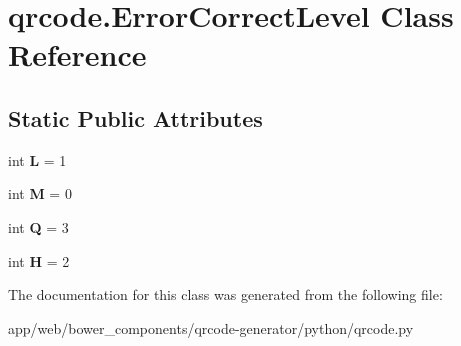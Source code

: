\hypertarget{classqrcode_1_1_error_correct_level}{}\section{qrcode.\+Error\+Correct\+Level Class Reference}
\label{classqrcode_1_1_error_correct_level}
\subsection*{Static Public Attributes}
\begin{DoxyCompactItemize}
\item 
\mbox{\label{classqrcode_1_1_error_correct_level_a9ebc42363c05ee1225ed0e50e692cf26}} 
int {\bfseries L} = 1
\item 
\mbox{\label{classqrcode_1_1_error_correct_level_a1905ffeb03df710febf79e311e68769c}} 
int {\bfseries M} = 0
\item 
\mbox{\label{classqrcode_1_1_error_correct_level_a2e8ef128628b23822059d892ac701821}} 
int {\bfseries Q} = 3
\item 
\mbox{\label{classqrcode_1_1_error_correct_level_a3f65dabdf3a76b2903441eeec69e2a6f}} 
int {\bfseries H} = 2
\end{DoxyCompactItemize}


The documentation for this class was generated from the following file\+:\begin{DoxyCompactItemize}
\item 
app/web/bower\+\_\+components/qrcode-\/generator/python/qrcode.\+py\end{DoxyCompactItemize}
